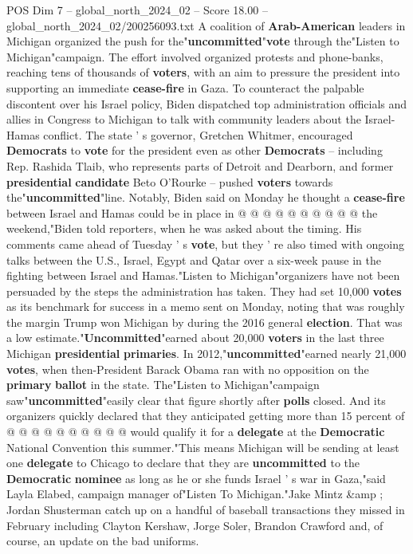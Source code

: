 \begin{textsample}{POS Dim 7 – global\_north\_2024\_02 – Score 18.00 – global\_north\_2024\_02/200256093.txt}
A coalition of \textbf{Arab-American} leaders in Michigan organized the push for the"\textbf{uncommitted}"\textbf{vote} through the"Listen to Michigan"campaign.
The effort involved organized protests and phone-banks, reaching tens of thousands of \textbf{voters}, with an aim to pressure the president into supporting an immediate \textbf{cease-fire} in Gaza.
To counteract the palpable discontent over his Israel policy, Biden dispatched top administration officials and allies in Congress to Michigan to talk with community leaders about the Israel-Hamas conflict.
The state ' s governor, Gretchen Whitmer, encouraged \textbf{Democrats} to \textbf{vote} for the president even as other \textbf{Democrats} -- including Rep.
Rashida Tlaib, who represents parts of Detroit and Dearborn, and former \textbf{presidential} \textbf{candidate} Beto O'Rourke -- pushed \textbf{voters} towards the"\textbf{uncommitted}"line.
Notably, Biden said on Monday he thought a \textbf{cease-fire} between Israel and Hamas could be in place in @ @ @ @ @ @ @ @ @ @ the weekend,"Biden told reporters, when he was asked about the timing.
His comments came ahead of Tuesday ' s \textbf{vote}, but they ' re also timed with ongoing talks between the U.S., Israel, Egypt and Qatar over a six-week pause in the fighting between Israel and Hamas."Listen to Michigan"organizers have not been persuaded by the steps the administration has taken.
They had set 10,000 \textbf{votes} as its benchmark for success in a memo sent on Monday, noting that was roughly the margin Trump won Michigan by during the 2016 general \textbf{election}.
That was a low estimate."\textbf{Uncommitted}"earned about 20,000 \textbf{voters} in the last three Michigan \textbf{presidential} \textbf{primaries}.
In 2012,"\textbf{uncommitted}"earned nearly 21,000 \textbf{votes}, when then-President Barack Obama ran with no opposition on the \textbf{primary} \textbf{ballot} in the state.
The"Listen to Michigan"campaign saw"\textbf{uncommitted}"easily clear that figure shortly after \textbf{polls} closed.
And its organizers quickly declared that they anticipated getting more than 15 percent of @ @ @ @ @ @ @ @ @ @ would qualify it for a \textbf{delegate} at the \textbf{Democratic} National Convention this summer."This means Michigan will be sending at least one \textbf{delegate} to Chicago to declare that they are \textbf{uncommitted} to the \textbf{Democratic} \textbf{nominee} as long as he or she funds Israel ' s war in Gaza,"said Layla Elabed, campaign manager of"Listen To Michigan."Jake Mintz \&amp ; Jordan Shusterman catch up on a handful of baseball transactions they missed in February including Clayton Kershaw, Jorge Soler, Brandon Crawford and, of course, an update on the bad uniforms.

\end{textsample}

